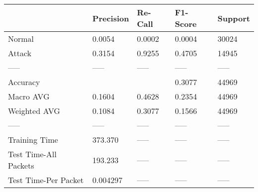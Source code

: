 \begin{tabular}{lllll}
\toprule
{} & Precision & Re-Call & F1-Score & Support \\
\midrule
Normal                &    0.0054 &  0.0002 &   0.0004 &   30024 \\
Attack                &    0.3154 &  0.9255 &   0.4705 &   14945 \\
-----                 &     ----- &   ----- &    ----- &   ----- \\
Accuracy              &           &         &   0.3077 &   44969 \\
Macro AVG             &    0.1604 &  0.4628 &   0.2354 &   44969 \\
Weighted AVG          &    0.1084 &  0.3077 &   0.1566 &   44969 \\
-----                 &     ----- &   ----- &    ----- &   ----- \\
Training Time         &   373.370 &   ----- &    ----- &   ----- \\
Test Time-All Packets &   193.233 &   ----- &    ----- &   ----- \\
Test Time-Per Packet  &  0.004297 &   ----- &    ----- &   ----- \\
\bottomrule
\end{tabular}
